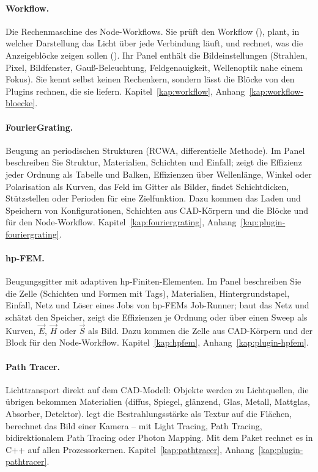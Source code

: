 \paragraph{Workflow.} Die Rechenmaschine des Node-Workflows. Sie prüft den Workflow
(), plant, in welcher Darstellung das Licht über jede Verbindung läuft, und
rechnet, was die Anzeigeblöcke zeigen sollen (). Ihr Panel enthält die
Bildeinstellungen (Strahlen, Pixel, Bildfenster, Gauß-Beleuchtung, Feldgenauigkeit, Wellenoptik
nahe einem Fokus). Sie kennt selbst keinen Rechenkern, sondern lässt die Blöcke von den Plugins
rechnen, die sie liefern. Kapitel~\ref{kap:workflow}, Anhang~\ref{kap:workflow-bloecke}.

\paragraph{FourierGrating.} Beugung an periodischen Strukturen (RCWA, differentielle Methode).
Im Panel beschreiben Sie Struktur, Materialien, Schichten und Einfall;  zeigt die
Effizienz jeder Ordnung als Tabelle und Balken,  Effizienzen über Wellenlänge,
Winkel oder Polarisation als Kurven,  das Feld im Gitter als Bilder,
 findet Schichtdicken, Stützstellen oder Perioden für eine Zielfunktion. Dazu
kommen das Laden und Speichern von Konfigurationen, Schichten aus CAD-Körpern und die Blöcke
 und  für den Node-Workflow. Kapitel~\ref{kap:fouriergrating},
Anhang~\ref{kap:plugin-fouriergrating}.

\paragraph{hp-FEM.} Beugungsgitter mit adaptiven hp-Finiten-Elementen. Im Panel beschreiben
Sie die Zelle (Schichten und Formen mit Tags), Materialien, Hintergrundstapel, Einfall, Netz und
Löser eines Jobs von hp-FEMs Job-Runner;  baut das Netz und schätzt den Speicher,
 zeigt die Effizienzen je Ordnung oder über einen Sweep als Kurven, 
$\vec E$, $\vec H$ oder $\vec S$ als Bild. Dazu kommen die Zelle aus CAD-Körpern und der Block
 für den Node-Workflow. Kapitel~\ref{kap:hpfem},
Anhang~\ref{kap:plugin-hpfem}.

\paragraph{Path Tracer.} Lichttransport direkt auf dem CAD-Modell: Objekte werden zu
Lichtquellen, die übrigen bekommen Materialien (diffus, Spiegel, glänzend, Glas, Metall,
Mattglas, Absorber, Detektor).  legt die Bestrahlungsstärke als Textur auf die
Flächen,  berechnet das Bild einer Kamera – mit Light Tracing, Path Tracing,
bidirektionalem Path Tracing oder Photon Mapping. Mit dem Paket  rechnet es in
C++ auf allen Prozessorkernen. Kapitel~\ref{kap:pathtracer},
Anhang~\ref{kap:plugin-pathtracer}.

